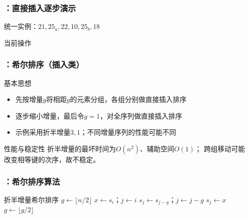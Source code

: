 \begin{frame}
    \frametitle{\insertsectionhead：直接插入逐步演示}
    \begin{exampleblock}{统一实例：$21,25_a,22,10,25_b,18$}
        \centering
    \end{exampleblock}
    \begin{block}{当前操作}
    \end{block}
\end{frame}

\begin{frame}
    \frametitle{\insertsectionhead：希尔排序（插入类）}
    \begin{block}{基本思想}
        \begin{itemize}
            \item 先按增量$g$将相距$g$的元素分组，各组分别做直接插入排序
            \item 逐步缩小增量，最后令$g=1$，对全序列做直接插入排序
            \item 示例采用折半增量$3,1$；不同增量序列的性能可能不同
        \end{itemize}
    \end{block}
    \begin{alertblock}{性能与稳定性}
        折半增量的最坏时间为$O(n^2)$、辅助空间$O(1)$；
        跨组移动可能改变相等键的次序，故不稳定。
    \end{alertblock}
\end{frame}

\begin{fragile}
    \frametitle{\insertsectionhead：希尔排序算法}
    \begin{algorithmx}{折半增量希尔排序}
        \State $g\gets\lfloor n/2\rfloor$
        \State $x\gets s_i$；$j\gets i$
        \State $s_j\gets s_{j-g}$；$j\gets j-g$
        \EndWhile
        \State $s_j\gets x$
        \EndFor
        \State $g\gets\lfloor g/2\rfloor$
        \EndWhile
        \EndProcedure
    \end{algorithmx}
\end{fragile}

